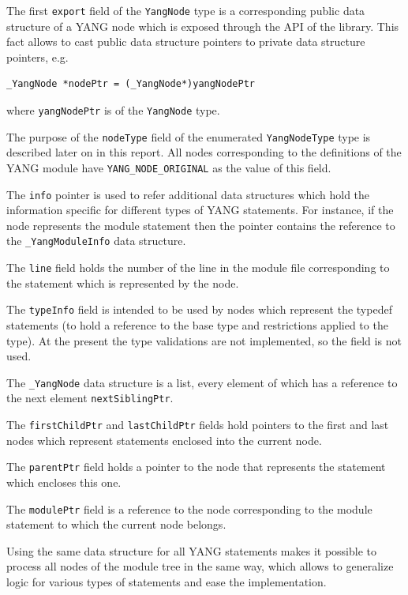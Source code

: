 \documentclass[conference]{IEEEtran}
\begin{document}
The first \texttt{export} field of the \texttt{YangNode} type is a corresponding public data structure of a YANG node which is exposed through the API of the library. This fact allows to cast public data structure pointers to private data structure pointers, e.g.
\small
\begin{verbatim}
_YangNode *nodePtr = (_YangNode*)yangNodePtr
\end{verbatim}
\normalsize
where \texttt{yangNodePtr} is of the \texttt{YangNode} type.

The purpose of the \texttt{nodeType} field of the enumerated \texttt{YangNodeType} type is described later on in this report. All nodes corresponding to the  definitions of the YANG module have \texttt{YANG\_NODE\_ORIGINAL} as the value of this field.

The \texttt{info} pointer is used to  refer additional data structures which hold the information specific for different types of YANG statements. For instance, if the node represents the module statement then the pointer contains the reference to the \texttt{\_YangModuleInfo} data structure.

The \texttt{line} field holds the number of the line in the module file corresponding to the statement which is represented by the node.

The \texttt{typeInfo} field is intended to be used by nodes which represent the typedef statements (to hold a reference to the base type and restrictions applied to the type). At the present the type validations are not implemented, so the field is not used.

The \texttt{\_YangNode} data structure is a list, every element of which has a reference to the next element \texttt{nextSiblingPtr}. 

The \texttt{firstChildPtr}  and \texttt{lastChildPtr} fields hold pointers to the first and last nodes which represent statements enclosed into the current node.

The \texttt{parentPtr}  field holds a pointer to the node that represents the statement which encloses this one.

The \texttt{modulePtr}  field is a reference to the node corresponding to the module statement to which  the current node belongs.

Using the same data structure for all YANG statements makes it possible to process all nodes of the module tree in the same way, which allows to generalize logic for various types of statements and ease the implementation.
\end{document}
